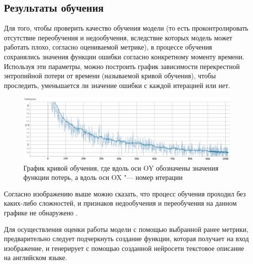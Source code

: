 \documentclass[bachelor, och, coursework]{SCWorks}
\begin{document}
    \subsection{Результаты обучения}

        Для того, чтобы проверить качество обучения модели (то есть
        проконтролировать отсутствие переобучения и недообучения, вследствие
        которых модель может работать плохо, согласно оцениваемой метрике), в
        процессе обучения сохранялись значения функции ошибки согласно
        конкретному моменту времени. Используя эти параметры, можно построить
        график зависимости перекрестной энтропийной потери от времени
        (называемой кривой обучения), чтобы проследить, уменьшается ли значение
        ошибки с каждой итерацией или нет.
        
        \begin{figure}[H]
            \centering
            \includegraphics[width=1\textwidth]{pics/curve.png}
            \caption{График кривой обучения, где вдоль оси OY обозначены
                     значения функции потерь, а вдоль оси OX "--- номер
                     итерации}
        \end{figure}

        Согласно изображению выше можно сказать, что процесс обучения проходил
        без каких-либо сложностей, и признаков недообучения и переобучения на
        данном графике не обнаружено \cite{fitting}.

        Для осуществления оценки работы модели с помощью выбранной ранее
        метрики, предварительно следует подчеркнуть создание функции, которая
        получает на вход изображение, и генерирует с помощью созданной нейросети
        текстовое описание на английском языке.
\end{document}
